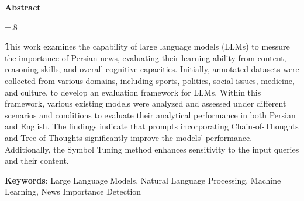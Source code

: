 

\begin{latin}

\begin{center}
\textbf{Abstract}
\end{center}
\baselineskip=.8\baselineskip

ُThis work examines the capability of large language models (LLMs) to messure the importance of Persian news, evaluating their learning ability from content, reasoning skills, and overall cognitive capacities. Initially, annotated datasets were collected from various domains, including sports, politics, social issues, medicine, and culture, to develop an evaluation framework for LLMs. Within this framework, various existing models were analyzed and assessed under different scenarios and conditions to evaluate their analytical performance in both Persian and English. The findings indicate that prompts incorporating Chain-of-Thoughts and Tree-of-Thoughts significantly improve the models' performance. Additionally, the Symbol Tuning method enhances sensitivity to the input queries and their content.


\bigskip\noindent\textbf{Keywords}:
Large Language Models, Natural Language Processing, Machine Learning, News Importance Detection

\end{latin}
